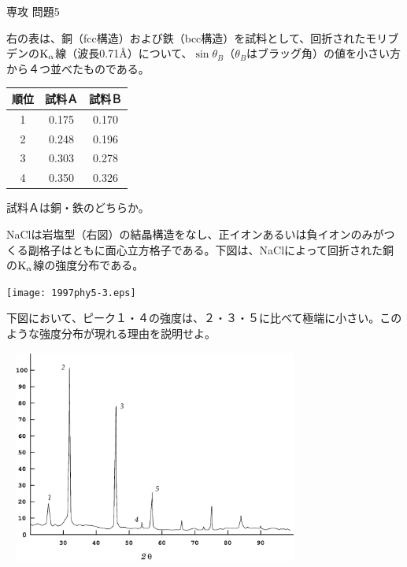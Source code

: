 \documentclass[fleqn]{jbook}
\begin{document}
\begin{question}{専攻 問題5}{}
\parbox[t]{110mm}{右の表は、銅（fcc構造）および鉄（bcc構造）を試料として、回折されたモリブデンの${\rm{K}}_\alpha$線（波長0.71Å）について、$\sin\theta_B$（$\theta_B$はブラッグ角）の値を小さい方から４つ並べたものである。}\parbox[t]{50mm}{\vspace*{-7mm}
\begin{center}
\begin{tabular}{|c|c|c|}\hline
順位 & 試料Ａ & 試料Ｂ \\ \hline 
1 & 0.175 & 0.170 \\ \hline
2 & 0.248 & 0.196 \\ \hline 
3 & 0.303 & 0.278 \\  \hline
4 & 0.350 & 0.326 \\ \hline
\end{tabular}
\end{center}
}

\begin{subquestions}[4]
\SubQuestion
試料Ａは銅・鉄のどちらか。
\end{subquestions}

\parbox[t]{110mm}{
NaClは岩塩型（右図）の結晶構造をなし、正イオンあるいは負イオンのみがつくる副格子はともに面心立方格子である。下図は、NaClによって回折された銅の${\rm{K}}_\alpha$線の強度分布である。}\parbox[t]{50mm}{\vspace*{-10mm}
\begin{center}
\texttt{[image: 1997phy5-3.eps]}
\end{center}
}

\begin{subquestions}[5]
\SubQuestion
下図において、ピーク１・４の強度は、２・３・５に比べて極端に小さい。このような強度分布が現れる理由を説明せよ。

\begin{center}
\includegraphics[clip,height=70mm,width=100mm]{1997phy5-4.eps}
\end{center}

\end{subquestions}
\end{question}
\end{document}
